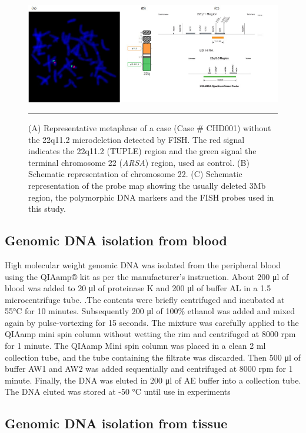 \begin{refsection}
\begin{figure}[!tb]
\centering
\includegraphics[width=\linewidth]{Figures/2_4fishcase.pdf} 
\rule{35em}{0.5pt}
\caption[FISH for 22q11.2 region]{(A) Representative metaphase of a case (Case \# CHD001) without the 22q11.2 microdeletion detected by FISH. The red signal indicates the 22q11.2 (TUPLE) region and the green signal the terminal chromosome 22 (\textit{ARSA}) region, used as control. (B) Schematic representation of chromosome 22. (C) Schematic representation of the probe map showing the usually deleted 3Mb region, the polymorphic DNA markers and the FISH probes used in this study.}
\label{fig:2_4fishcase}
\end{figure}

\subsection{Genomic DNA isolation from blood}\label{dnaisolation}

High molecular weight genomic DNA was isolated from the peripheral blood using the QIAamp® kit as per the manufacturer’s instruction. About 200 μl of blood was added to 20 μl of proteinase K and 200 μl of buffer AL in a 1.5 microcentrifuge tube. .The contents were briefly centrifuged and incubated at 55°C for 10 minutes. Subsequently 200 μl of 100\% ethanol was added and mixed again by pulse-vortexing for 15 seconds. The mixture was carefully applied to the QIAamp mini spin column without wetting the rim and centrifuged at 8000 rpm for 1 minute. The QIAamp Mini spin column was placed in a clean 2 ml collection tube, and the tube containing the filtrate was discarded. Then 500 μl of buffer AW1 and AW2 was added sequentially and centrifuged at 8000 rpm for 1 minute. Finally, the DNA was eluted in 200 μl of AE buffer into a collection tube. The DNA eluted was stored at -50 °C until use in experiments
 
\subsection{Genomic DNA isolation from tissue} \label{tissuedna}


\end{refsection}
